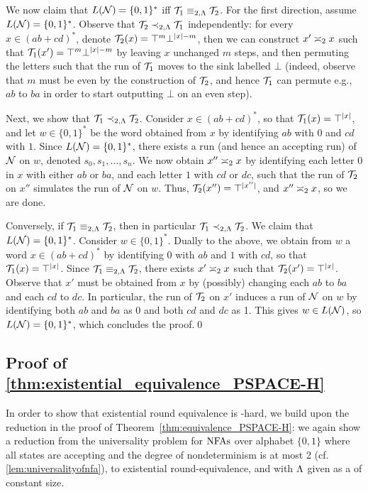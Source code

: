 We now claim that $L(\cN)=\{0,1\}^*$ iff $\cT_1\equiv_{2,\fL}\cT_2$.
For the first direction, assume $L(\cN)=\{0,1\}^*$. Observe that $\cT_2\prec_{2,\fL}\cT_1$ independently: for every $x\in (ab+cd)^*$, denote $\cT_2(x)=\top^{m}\bot^{|x|-m}$, then we can construct $x'\req[2]x$ such that $\cT_1(x')=\top^{m}\bot^{|x|-m}$ by leaving $x$ unchanged $m$ steps, and then permuting the letters such that the run of $\cT_1$ moves to the sink labelled $\bot$ (indeed, observe that $m$ must be even by the construction of $\cT_2$, and hence $\cT_1$ can permute e.g., $ab$ to $ba$ in order to start outputting $\bot$ on an even step).

Next, we show that $\cT_1\prec_{2,\fL}\cT_2$. Consider $x\in (ab+cd)^*$, so that $\cT_1(x)=\top^{|x|}$, and let $w\in \{0,1\}^*$ be the word obtained from $x$ by identifying $ab$ with $0$ and $cd$ with $1$. Since $L(\cN)=\{0,1\}^*$, there exists a run (and hence an accepting run) of $\cN$ on $w$, denoted $s_0,s_1,\ldots,s_n$. We now obtain $x''\req[2]x$ by identifying each letter $0$ in $x$ with either $ab$ or $ba$, and each letter $1$ with $cd$ or $dc$, such that the run of $\cT_2$ on $x''$ simulates the run of $\cN$ on $w$. Thus, $\cT_2(x'')=\top^{|x''|}$, and $x''\req[2]x$, so we are done.

Conversely, if $\cT_1\equiv_{2,\fL}\cT_2$, then in particular $\cT_1\prec_{2,\fL}\cT_2$. We claim that $L(\cN)=\{0,1\}^*$. Consider $w\in \{0,1\}^*$. Dually to the above, we obtain from $w$ a word $x\in (ab+cd)^*$ by identifying $0$ with $ab$ and $1$ with $cd$, so that $\cT_1(x)=\top^{|x|}$. 
Since $\cT_1\equiv_{2,\fL}\cT_2$, there exists $x'\req[2]x$ such that $\cT_2(x')=\top^{|x|}$. Observe that $x'$ must be obtained from $x$ by (possibly) changing each $ab$ to $ba$ and each $cd$ to $dc$. In particular, the run of $\cT_2$ on $x'$ induces a run of $\cN$ on $w$ by identifying both $ab$ and $ba$ as 0 and both $cd$ and $dc$ as 1. This gives $w\in L(\cN)$, so $L(\cN)=\{0,1\}^*$, which concludes the proof.\qed

\subsection{Proof of \autoref{thm:existential_equivalence_PSPACE-H}}
\label{apx:proof_existential_PSPACE-H}
In order to show that existential round equivalence is \PSPACE-hard, we build upon the reduction in the proof of Theorem~\ref{thm:equivalence_PSPACE-H}: we again show a reduction from the universality problem for $\NFAs$ over alphabet $\{0,1\}$ where all states are accepting and the degree of nondeterminism is at most 2 (cf. \autoref{lem:universalityofnfa}), to existential round-equivalence, and with $\fL$ given as a \DFA of constant size. 

